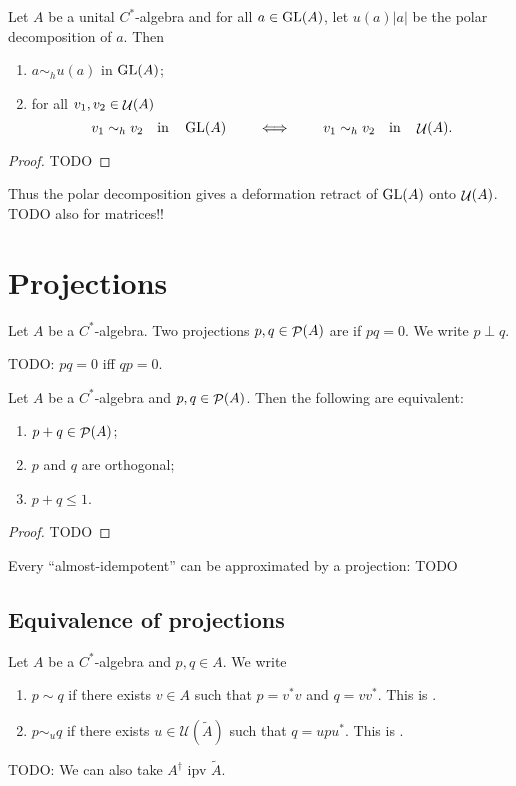 \begin{proposition} \label{unitariesRetractionOfGL}
Let $A$ be a unital $C^*$-algebra and for all $a\in\operatorname{GL}(A)$, let $u(a)|a|$ be the polar decomposition of $a$. Then
\begin{enumerate}
\item $a\sim_h u(a)$ in $\operatorname{GL}(A)$;
\item for all $v_1,v_2\in\mathop{\mathcal{U}}\nolimits(A)$
\[ v_1\sim_h v_2 \quad \text{in}\quad \operatorname{GL}(A) \qquad \iff \qquad v_1\sim_h v_2 \quad \text{in}\quad \mathop{\mathcal{U}}\nolimits(A). \]
\end{enumerate}
\end{proposition}
\begin{proof}
TODO
\end{proof}
Thus the polar decomposition gives a deformation retract of $\operatorname{GL}(A)$ onto $\mathop{\mathcal{U}}\nolimits(A)$.
TODO also for matrices!!


\section{Projections}
\begin{definition}
Let $A$ be a $C^*$-algebra. Two projections $p,q\in\mathop{\mathcal{P}}\nolimits(A)$ are  if $pq = 0$. We write $p \perp q$.
\end{definition}
TODO: $pq = 0$ iff $qp = 0$.

\begin{lemma}
Let $A$ be a $C^*$-algebra and $p,q\in\mathop{\mathcal{P}}\nolimits(A)$. Then the following are equivalent:
\begin{enumerate}
\item $p+q \in \mathop{\mathcal{P}}\nolimits(A)$;
\item $p$ and $q$ are orthogonal;
\item $p+q \leq 1$.
\end{enumerate}
\end{lemma}
\begin{proof}
TODO
\end{proof}
Every ``almost-idempotent'' can be approximated by a projection:
TODO



\subsection{Equivalence of projections}
\begin{definition}
Let $A$ be a $C^*$-algebra and $p,q\in A$. We write
\begin{enumerate}
\item $p\sim q$ if there exists $v\in A$ such that $p = v^*v$ and $q=vv^*$. This is .
\item $p \sim_u q$ if there exists $u\in \mathcal{U}(\tilde{A})$ such that $q = upu^*$. This is .
\end{enumerate}
\end{definition}
TODO: We can also take $A^\dagger$ ipv $\tilde{A}$.

